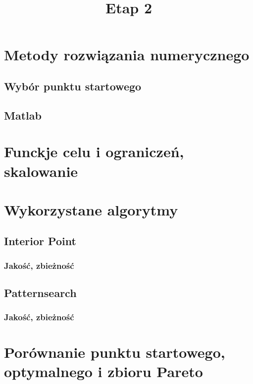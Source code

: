 \documentclass{article}
\begin{document}
\section{Metody rozwiązania numerycznego}
\subsection{Wybór punktu startowego}
\subsection{Matlab}
\pagebreak
\begin{center}
	\title{ \huge \textbf{Etap 2}}
\end{center}

\section{Funckje celu i ograniczeń, skalowanie}
\section{Wykorzystane algorytmy}
\subsection{Interior Point}
\subsubsection*{Jakość, zbieżność}
\subsection{Patternsearch}
\subsubsection*{Jakość, zbieżność}
\section{Porównanie punktu startowego, optymalnego i zbioru Pareto}
\end{document}
